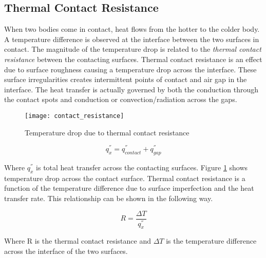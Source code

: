 \begin{doublespacing}
\section{Thermal Contact Resistance}
When two bodies come in contact, heat flows from the hotter to the colder body. A temperature difference is observed at the interface between the two surfaces in contact. The magnitude of the temperature drop is related to the \textit{thermal contact resistance} between the contacting surfaces. Thermal contact resistance is an effect due to surface roughness causing a temperature drop across the interface. These surface irregularities creates intermittent points of contact and air gap in the interface. The heat transfer is actually governed by both the conduction through the contact spots and conduction or convection/radiation across the gaps.
\begin{figure}[H]
\centering
\texttt{[image: contact\_resistance]}
\caption{Temperature drop due to thermal contact resistance}
\label{fig_contact_res}
\end{figure}

 \begin{equation}
 q_x^{''} = q_{contact}^{''} + q_{gap}^{''}
 \end{equation}
 
 Where $q_x^{''}$ is total heat transfer across the contacting surfaces. Figure \ref{fig_contact_res} shows temperature drop across the contact surface\cite{bergman2011fundamentals}. Thermal contact resistance is a function of the temperature difference due to surface imperfection and the heat transfer rate. This relationship can be shown in the following way.
 
\begin{equation}
\label{eq_contact_res}
R=\frac{\Delta T}{q_{x}^{''}}
\end{equation}

Where R is the thermal contact resistance and $\Delta T$ is the temperature difference across the interface of the two surfaces.


\end{doublespacing}
